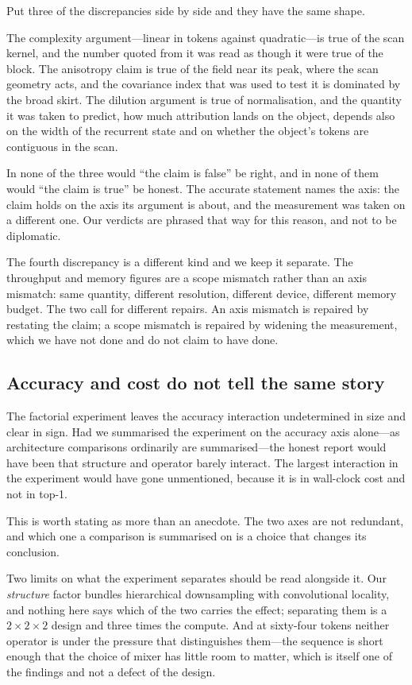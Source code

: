 Put three of the discrepancies side by side and they have the same shape.

The complexity argument---linear in tokens against quadratic---is true of the
scan kernel, and the number quoted from it was read as though it were true of
the block. The anisotropy claim is true of the field near its peak, where the
scan geometry acts, and the covariance index that was used to test it is
dominated by the broad skirt. The dilution argument is true of
normalisation, and the quantity it was taken to predict, how much attribution
lands on the object, depends also on the width of the recurrent state and on
whether the object's tokens are contiguous in the scan.

In none of the three would ``the claim is false'' be right, and in none of
them would ``the claim is true'' be honest. The accurate statement names the
axis: the claim holds on the axis its argument is about, and the measurement
was taken on a different one. Our verdicts are phrased that way for this
reason, and not to be diplomatic.

The fourth discrepancy is a different kind and we keep it separate. The
throughput and memory figures are a scope mismatch rather than an axis
mismatch: same quantity, different resolution, different device, different
memory budget. The two call for different repairs. An axis mismatch is
repaired by restating the claim; a scope mismatch is repaired by widening the
measurement, which we have not done and do not claim to have done.

\subsection{Accuracy and cost do not tell the same story}

The factorial experiment leaves the accuracy interaction undetermined in size
and clear in sign. Had we summarised the experiment on the accuracy axis
alone---as architecture comparisons ordinarily are summarised---the honest
report would have been that structure and operator barely interact. The
largest interaction in the experiment would have gone unmentioned, because it
is in wall-clock cost and not in top-1.

This is worth stating as more than an anecdote. The two axes are not
redundant, and which one a comparison is summarised on is a choice that
changes its conclusion.

Two limits on what the experiment separates should be read alongside it. Our
\emph{structure} factor bundles hierarchical downsampling with convolutional
locality, and nothing here says which of the two carries the effect;
separating them is a $2 \times 2 \times 2$ design and three times the
compute. And at sixty-four tokens neither operator is under the pressure that
distinguishes them---the sequence is short enough that the choice of mixer has
little room to matter, which is itself one of the findings and not a defect of
the design.

